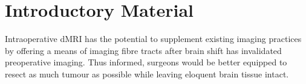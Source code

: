 \chapter{Introductory Material}
\label{chapterlabel1}

Intraoperative dMRI has the potential to supplement existing imaging practices by offering a means of imaging fibre tracts after brain shift has invalidated preoperative imaging.\autocite{Nimsky2001}
Thus informed, surgeons would be better equipped to resect as much tumour as possible while leaving eloquent brain tissue intact.
